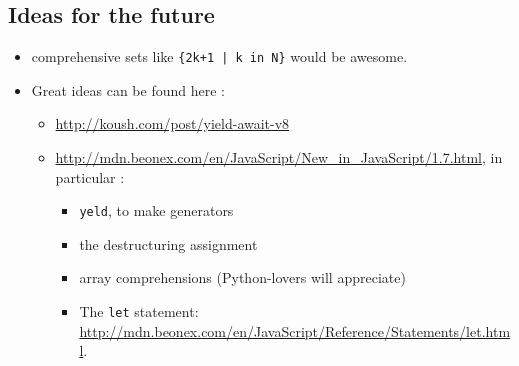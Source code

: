 \documentclass{article}
\begin{document}
\begin{sloppypar}
   

\subsection*{ Ideas for the future}


\begin{itemize}
	\item{ comprehensive sets like \verb!{2k+1 | k in N}! would be awesome.}
	\item{ Great ideas can be found here :
\begin{itemize}
	\item{ \href{http://koush.com/post/yield-await-v8}{http://koush.com/post/yield-await-v8}}
	\item{ \href{http://mdn.beonex.com/en/JavaScript/New\_in\_JavaScript/1.7.html}{http://mdn.beonex.com/en/JavaScript/New\_in\_JavaScript/1.7.html}, in particular :
\begin{itemize}
	\item{ \verb!yeld!, to make generators}
	\item{ the destructuring assignment}
	\item{ array comprehensions (Python-lovers will appreciate)}
	\item{ The \verb!let! statement: \href{http://mdn.beonex.com/en/JavaScript/Reference/Statements/let.html}{http://mdn.beonex.com/en/JavaScript/Reference/Statements/let.html}.}
\end{itemize}
}
\end{itemize}
}
\end{itemize}

\end{sloppypar}
\end{document}
